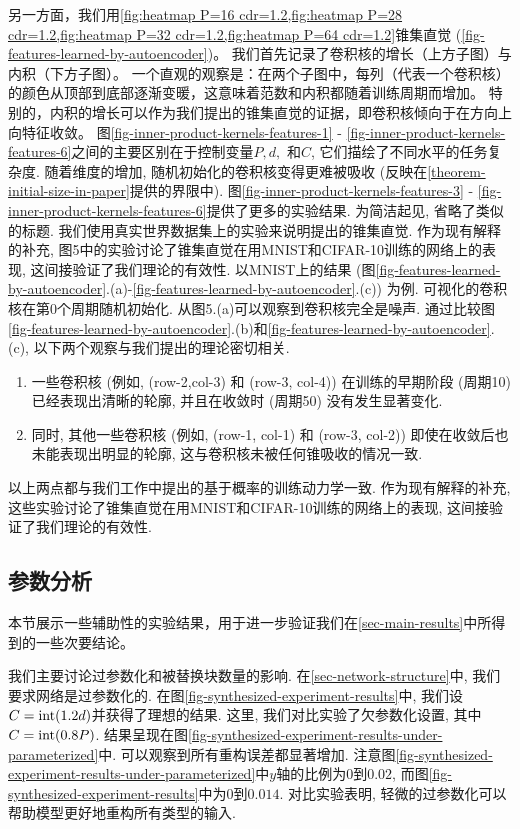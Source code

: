 另一方面，我们用\cref{fig:heatmap P=16 cdr=1.2,fig:heatmap P=28 cdr=1.2,fig:heatmap P=32 cdr=1.2,fig:heatmap P=64 cdr=1.2}锥集直觉 (\cref{fig-features-learned-by-autoencoder})。
我们首先记录了卷积核的增长（上方子图）与内积（下方子图）。
一个直观的观察是：在两个子图中，每列（代表一个卷积核）的颜色从顶部到底部逐渐变暖，这意味着范数和内积都随着训练周期而增加。
特别的，内积的增长可以作为我们提出的锥集直觉的证据，即卷积核倾向于在方向上向特征收敛。
图\cref{fig-inner-product-kernels-features-1} - \cref{fig-inner-product-kernels-features-6}之间的主要区别在于控制变量$P, d,$ 和$C$, 它们描绘了不同水平的任务复杂度.
随着维度的增加, 随机初始化的卷积核变得更难被吸收 (反映在\cref{theorem-initial-size-in-paper}提供的界限中).
图\cref{fig-inner-product-kernels-features-3} - \cref{fig-inner-product-kernels-features-6}提供了更多的实验结果.
为简洁起见, 省略了类似的标题.
我们使用真实世界数据集上的实验来说明提出的锥集直觉. 作为现有解释的补充, 图5中的实验讨论了锥集直觉在用MNIST和CIFAR-10训练的网络上的表现, 这间接验证了我们理论的有效性.     
以MNIST上的结果 (图\cref{fig-features-learned-by-autoencoder}.(a)-\cref{fig-features-learned-by-autoencoder}.(c)) 为例.
可视化的卷积核在第0个周期随机初始化. 从图5.(a)可以观察到卷积核完全是噪声. 通过比较图\cref{fig-features-learned-by-autoencoder}.(b)和\cref{fig-features-learned-by-autoencoder}.(c), 以下两个观察与我们提出的理论密切相关.
\begin{enumerate}
    \item 一些卷积核 (例如, (row-2,col-3) 和 (row-3, col-4)) 在训练的早期阶段 (周期10) 已经表现出清晰的轮廓, 并且在收敛时 (周期50) 没有发生显著变化. 
    \item 同时, 其他一些卷积核 (例如, (row-1, col-1) 和 (row-3, col-2)) 即使在收敛后也未能表现出明显的轮廓, 这与卷积核未被任何锥吸收的情况一致.
\end{enumerate}
以上两点都与我们工作中提出的基于概率的训练动力学一致. 作为现有解释的补充, 这些实验讨论了锥集直觉在用MNIST和CIFAR-10训练的网络上的表现, 这间接验证了我们理论的有效性.

\subsection{参数分析}\label{sec-aux-results-syn}

本节展示一些辅助性的实验结果，用于进一步验证我们在\cref{sec-main-results}中所得到的一些次要结论。

我们主要讨论过参数化和被替换块数量的影响. 
在\cref{sec-network-structure}中, 我们要求网络是过参数化的. 
在图\cref{fig-synthesized-experiment-results}中, 我们设$C = {\rm{int}}(1.2d)$并获得了理想的结果.
这里, 我们对比实验了欠参数化设置, 其中$C = {\rm{int}}(0.8P)$.
结果呈现在图\cref{fig-synthesized-experiment-results-under-parameterized}中. 
可以观察到所有重构误差都显著增加. 注意图\cref{fig-synthesized-experiment-results-under-parameterized}中$y$轴的比例为$0$到$0.02$, 而图\cref{fig-synthesized-experiment-results}中为$0$到$0.014$.
对比实验表明, 轻微的过参数化可以帮助模型更好地重构所有类型的输入.


